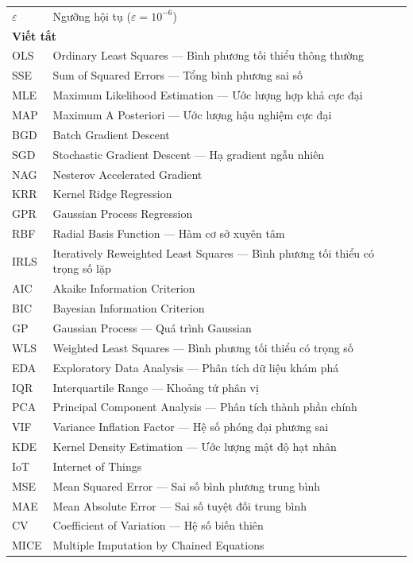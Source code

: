\documentclass[oneside]{styles/hcmus-report}
\begin{document}
\begin{longtable}{p{} p{}}
$\varepsilon$ & Ngưỡng hội tụ ($\varepsilon = 10^{-6}$) \\ 

\multicolumn{2}{l}{\textbf{Viết tắt}} \\
\hline
OLS & Ordinary Least Squares --- Bình phương tối thiểu thông thường \\
SSE & Sum of Squared Errors --- Tổng bình phương sai số \\
MLE & Maximum Likelihood Estimation --- Ước lượng hợp khả cực đại \\
MAP & Maximum A Posteriori --- Ước lượng hậu nghiệm cực đại \\
BGD & Batch Gradient Descent \\
SGD & Stochastic Gradient Descent --- Hạ gradient ngẫu nhiên \\
NAG & Nesterov Accelerated Gradient \\
KRR & Kernel Ridge Regression \\
GPR & Gaussian Process Regression \\
RBF & Radial Basis Function --- Hàm cơ sở xuyên tâm \\
IRLS & Iteratively Reweighted Least Squares --- Bình phương tối thiểu có trọng số lặp \\
AIC & Akaike Information Criterion \\
BIC & Bayesian Information Criterion \\
GP  & Gaussian Process --- Quá trình Gaussian \\
WLS & Weighted Least Squares --- Bình phương tối thiểu có trọng số \\
EDA     & Exploratory Data Analysis --- Phân tích dữ liệu khám phá \\
IQR     & Interquartile Range --- Khoảng tứ phân vị \\
PCA     & Principal Component Analysis --- Phân tích thành phần chính \\
VIF     & Variance Inflation Factor --- Hệ số phóng đại phương sai \\
KDE     & Kernel Density Estimation --- Ước lượng mật độ hạt nhân \\
IoT     & Internet of Things \\
MSE     & Mean Squared Error --- Sai số bình phương trung bình \\
MAE     & Mean Absolute Error --- Sai số tuyệt đối trung bình \\
CV      & Coefficient of Variation --- Hệ số biến thiên \\
MICE    & Multiple Imputation by Chained Equations \\

\end{longtable}
\end{document}

